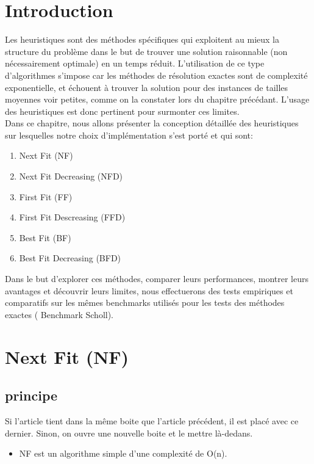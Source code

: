 \documentclass[class=article, crop=false]{standalone}
\begin{document}
\section{Introduction}
Les heuristiques sont des méthodes spécifiques qui exploitent au mieux la structure du 
problème dans le but de trouver une solution raisonnable (non nécessairement optimale) en un temps réduit. 
L’utilisation de ce type d’algorithmes s'impose car les méthodes de résolution exactes sont 
de complexité exponentielle, et échouent à trouver la solution pour des instances de tailles moyennes voir petites,
 comme on la constater lors du chapitre précédant. 
L'usage des heuristiques est donc pertinent pour surmonter ces limites.\\

Dans ce chapitre, nous allons présenter la conception détaillée des heuristiques sur lesquelles notre choix d’implémentation s’est porté et qui sont:
\begin{enumerate}
    \item Next Fit (NF)
    \item Next Fit Decreasing (NFD)
    \item First Fit (FF)
    \item First Fit Descreasing (FFD)
    \item Best Fit (BF)
    \item Best Fit Decreasing (BFD)\\
\end{enumerate}

Dans le but d’explorer ces méthodes, comparer leurs performances, montrer leurs avantages et découvrir leurs limites, nous effectuerons des tests empiriques et comparatifs sur les mêmes  benchmarks utilisés pour les tests des méthodes exactes ( Benchmark Scholl).
\newpage
\section{Next Fit (NF)}
\subsection{principe}
Si l’article tient dans la même boite que l’article précédent, il est placé avec ce dernier. Sinon, on ouvre une nouvelle boite et le mettre là-dedans.
\begin{itemize}
    \item NF est un algorithme simple d’une complexité de O(n). 
\end{itemize}
\end{document}
